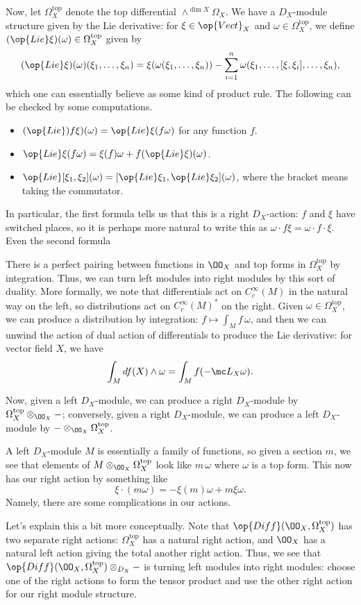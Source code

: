 \documentclass{article}
\begin{document}
Now, let $\Omega_X^{\mathrm{top}}$ denote the top differential $\land^{\dim X}\Omega_X$. We have a $D_X$-module structure given by the Lie derivative: for $\xi\in\op{Vect}_X$ and $\omega\in\Omega_X^{\mathrm{top}}$, we define $(\op{Lie}\xi)(\omega)\in\Omega_X^{\mathrm{top}}$ given by
\[(\op{Lie}\xi)(\omega)(\xi_1,\ldots,\xi_n)=\xi(\omega(\xi_1,\ldots,\xi_n))-\sum_{i=1}^n\omega(\xi_1,\ldots,[\xi,\xi_i],\ldots,\xi_n),\]
which one can essentially believe as some kind of product rule. The following can be checked by some computations.
\begin{itemize}
	\item $(\op{Lie})f\xi)(\omega)=\op{Lie}\xi(f\omega)$ for any function $f$.
	\item $\op{Lie}\xi(f\omega)=\xi(f)\omega+f(\op{Lie}\xi)(\omega)$.
	\item $\op{Lie}[\xi_1,\xi_2](\omega)=[{\op{Lie}\xi_1},{\op{Lie}\xi_2}](\omega)$, where the bracket means taking the commutator.
\end{itemize}
In particular, the first formula tells us that this is a right $D_X$-action: $f$ and $\xi$ have switched places, so it is perhaps more natural to write this as $\omega\cdot f\xi=\omega\cdot f\cdot\xi$. Even the second formula
\begin{remark}[Nadler]
	There is a perfect pairing between functions in $\OO_X$ and top forms in $\Omega_X^{\mathrm{top}}$ by integration. Thus, we can turn left modules into right modules by this sort of duality. More formally, we note that differentials act on $C_c^\infty(M)$ in the natural way on the left, so distributions act on $C_c^\infty(M)^*$ on the right. Given $\omega\in\Omega_X^{\mathrm{top}}$, we can produce a distribution by integration: $f\mapsto\int_Mf\,\omega$, and then we can unwind the action of dual action of differentials to produce the Lie derivative: for vector field $X$, we have
	\[\int_Mdf(X)\land\omega=\int_Mf(-\mc L_X\omega).\]
\end{remark}
Now, given a left $D_X$-module, we can produce a right $D_X$-module by $\Omega_X^{\mathrm{top}}\otimes_{\OO_X}-$; conversely, given a right $D_X$-module, we can produce a left $D_X$-module by $-\otimes_{\OO_X}\Omega_X^{\mathrm{top}}$.
\begin{example}
	A left $D_X$-module $M$ is essentially a family of functions, so given a section $m$, we see that elements of $M\otimes_{\OO_X}\Omega_X^{\mathrm{top}}$ look like $m\,\omega$ where $\omega$ is a top form. This now has our right action by something like
	\[\xi\cdot(m\omega)=-\xi(m)\omega+m\xi\omega.\]
	Namely, there are some complications in our actions.
\end{example}
\begin{remark}
	Let's explain this a bit more conceptually. Note that $\op{Diff}(\OO_X,\Omega_X^{\mathrm{top}})$ has two separate right actions: $\Omega_X^{\mathrm{top}}$ has a natural right action, and $\OO_X$ has a natural left action giving the total another right action. Thus, we see that $\op{Diff}(\OO_X,\Omega_X^{\mathrm{top}})\otimes_{D_X}-$ is turning left modules into right modules: choose one of the right actions to form the tensor product and use the other right action for our right module structure.
\end{remark}
\end{document}
